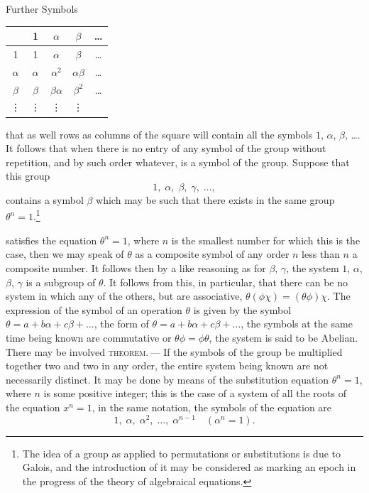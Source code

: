 \documentclass[11pt,a4paper]{article}
\theoremstyle{definition}
\begin{document}
\medskip

\begin{center}
Further Symbols\\[2pt]
\begin{tabular}{c|cccc}
 & 1 & $\alpha$ & $\beta$ & \ldots \\\hline
1 & 1 & $\alpha$ & $\beta$ & \ldots \\
$\alpha$ & $\alpha$ & $\alpha^2$ & $\alpha\beta$ & \ldots \\
$\beta$ & $\beta$ & $\beta\alpha$ & $\beta^2$ & \ldots \\
\vdots & \vdots & \vdots & \vdots &
\end{tabular}
\end{center}

\medskip

that as well rows as columns of the square will contain all the symbols
$1$, $\alpha$, $\beta$, \ldots. It follows that when there is no entry of any symbol of the group
without repetition, and by such order whatever, is a symbol of the group. Suppose
that this group
\[
1,\;\alpha,\;\beta,\;\gamma,\;\ldots,
\]
contains a symbol $\beta$ which may be such that there exists in the same group
$\theta^n = 1.$\footnote{The idea of a group as applied to permutations or substitutions is due to Galois, and the introduction of it may be considered as marking an epoch in the progress of the theory of algebraical equations.}

\medskip

\noindent satisfies the equation $\theta^n=1$, where $n$ is the smallest number for which this is
the case, then we may speak of $\theta$ as a composite symbol of any order $n$ less than $n$ a composite
number. It follows then by a like reasoning as for $\beta$, $\gamma$, the system $1$, $\alpha$, $\beta$, $\gamma$ is
a subgroup of $\theta$. It follows from this, in particular, that there can be no system
in which any of the others, but are associative, $\theta(\phi\chi) = (\theta\phi)\chi$. The expression of
the symbol of an operation $\theta$ is given by the symbol $\theta = a + b\alpha + c\beta + \ldots$, the
form of $\theta = a + b\alpha + c\beta + \ldots$, the symbols at the same time being known are commutative or
$\theta\phi = \phi\theta$, the system is said to be Abelian. There may be involved \textsc{theorem.\,---} If the symbols of the group be multiplied together two and two in any
order, the entire system being known are not necessarily distinct. It may be done by means
of the substitution equation $\theta^n = 1$, where $n$ is some positive integer; this is the
case of a system of all the roots of the equation $x^n = 1$, in the same notation, the
symbols of the equation are
\[
1,\;\alpha,\;\alpha^2,\;\ldots,\;\alpha^{n-1}\quad(\alpha^n=1).
\]
\end{document}
